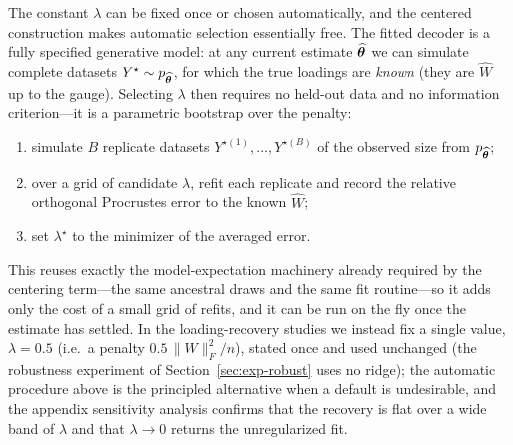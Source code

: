 \documentclass[twoside,11pt]{article}
\begin{document}
The constant $\lambda$ can be fixed once or chosen automatically, and the centered construction makes automatic selection essentially free. The fitted decoder is a fully specified generative model: at any current estimate $\widehat{{\bm{\theta}}}$ we can simulate complete datasets $Y^\star \sim p_{\widehat{{\bm{\theta}}}}$, for which the true loadings are \emph{known} (they are $\widehat W$ up to the gauge). Selecting $\lambda$ then requires no held-out data and no information criterion---it is a parametric bootstrap over the penalty:
\begin{enumerate}
\item simulate $B$ replicate datasets $Y^{\star (1)},\dots,Y^{\star (B)}$ of the observed size from $p_{\widehat{{\bm{\theta}}}}$;
\item over a grid of candidate $\lambda$, refit each replicate and record the relative orthogonal Procrustes error to the known $\widehat W$;
\item set $\lambda^\star$ to the minimizer of the averaged error.
\end{enumerate}
This reuses exactly the model-expectation machinery already required by the centering term---the same ancestral draws and the same fit routine---so it adds only the cost of a small grid of refits, and it can be run on the fly once the estimate has settled. In the loading-recovery studies we instead fix a single value, $\lambda = 0.5$ (i.e.\ a penalty $0.5\,\|W\|_F^2/n$), stated once and used unchanged (the robustness experiment of Section~\ref{sec:exp-robust} uses no ridge); the automatic procedure above is the principled alternative when a default is undesirable, and the appendix sensitivity analysis confirms that the recovery is flat over a wide band of $\lambda$ and that $\lambda\to 0$ returns the unregularized fit.
\end{document}
